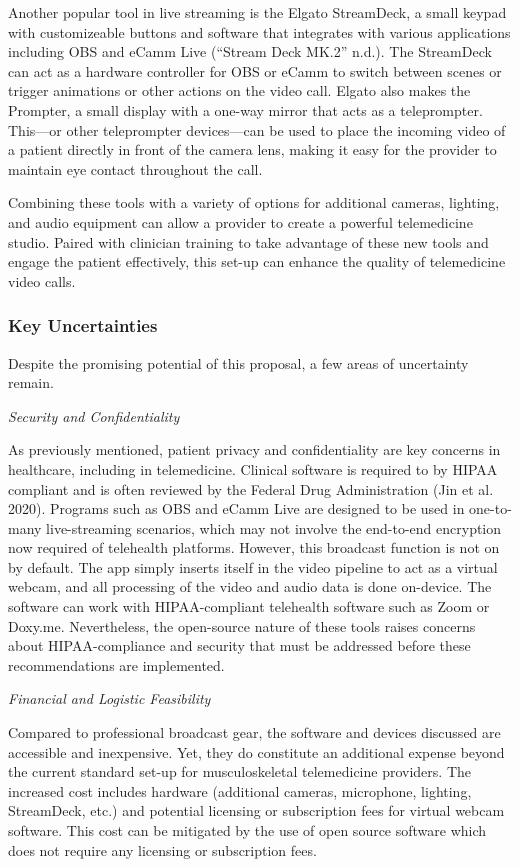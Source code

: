 \documentclass[
  letterpaper,
]{article}
\begin{document}
Another popular tool in live streaming is the Elgato StreamDeck, a small
keypad with customizeable buttons and software that integrates with
various applications including OBS and eCamm Live ({``Stream {Deck
MK}.2''} n.d.). The StreamDeck can act as a hardware controller for OBS
or eCamm to switch between scenes or trigger animations or other actions
on the video call. Elgato also makes the Prompter, a small display with
a one-way mirror that acts as a teleprompter. This---or other
teleprompter devices---can be used to place the incoming video of a
patient directly in front of the camera lens, making it easy for the
provider to maintain eye contact throughout the call.

Combining these tools with a variety of options for additional cameras,
lighting, and audio equipment can allow a provider to create a powerful
telemedicine studio. Paired with clinician training to take advantage of
these new tools and engage the patient effectively, this set-up can
enhance the quality of telemedicine video calls.

\subsubsection{Key Uncertainties}\label{key-uncertainties}

Despite the promising potential of this proposal, a few areas of
uncertainty remain.

\emph{Security and Confidentiality}

As previously mentioned, patient privacy and confidentiality are key
concerns in healthcare, including in telemedicine. Clinical software is
required to by HIPAA compliant and is often reviewed by the Federal Drug
Administration (Jin et al. 2020). Programs such as OBS and eCamm Live
are designed to be used in one-to-many live-streaming scenarios, which
may not involve the end-to-end encryption now required of telehealth
platforms. However, this broadcast function is not on by default. The
app simply inserts itself in the video pipeline to act as a virtual
webcam, and all processing of the video and audio data is done
on-device. The software can work with HIPAA-compliant telehealth
software such as Zoom or Doxy.me. Nevertheless, the open-source nature
of these tools raises concerns about HIPAA-compliance and security that
must be addressed before these recommendations are implemented.

\emph{Financial and Logistic Feasibility}

Compared to professional broadcast gear, the software and devices
discussed are accessible and inexpensive. Yet, they do constitute an
additional expense beyond the current standard set-up for
musculoskeletal telemedicine providers. The increased cost includes
hardware (additional cameras, microphone, lighting, StreamDeck, etc.)
and potential licensing or subscription fees for virtual webcam
software. This cost can be mitigated by the use of open source software
which does not require any licensing or subscription fees.
\end{document}
